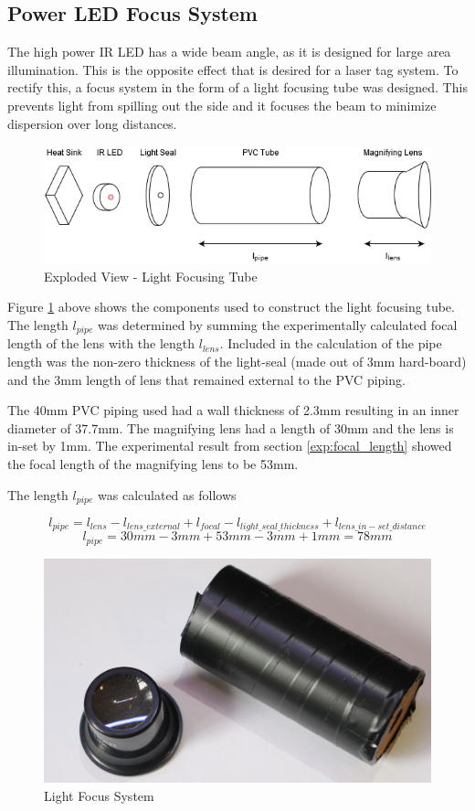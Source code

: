 \subsection{Power LED Focus System}

The high power IR LED has a wide beam angle, as it is designed for large area illumination. This is the opposite effect that is desired for a laser tag system. To rectify this, a focus system in the form of a light focusing tube was designed. This prevents light from spilling out the side and it focuses the beam to minimize dispersion over long distances.

\begin{figure}[H]
	\centering
	\includegraphics[width=.8\textwidth]{figures/design/beam_tube.png}
	\caption{Exploded View - Light Focusing Tube}
	\label{fig:light_focusing_tube}
\end{figure}

Figure \ref{fig:light_focusing_tube} above shows the components used to construct the light focusing tube. The length $l_{pipe}$ was determined by summing the experimentally calculated focal length of the lens with the length $l_{lens}$. Included in the calculation of the pipe length was the non-zero thickness of the light-seal (made out of 3mm hard-board) and the 3mm length of lens that remained external to the PVC piping.

The 40mm PVC piping used had a wall thickness of 2.3mm resulting in an inner diameter of 37.7mm. The magnifying lens had a length of 30mm and the lens is in-set by 1mm. The experimental result from section \ref{exp:focal_length} showed the focal length of the magnifying lens to be 53mm.

The length $l_{pipe}$ was calculated as follows

\[l_{pipe} = l_{lens} - l_{lens\_external} + l_{focal} - l_{light\_seal\_thickness} + l_{lens\_in-set\_distance}\]
\[l_{pipe} = 30mm - 3mm + 53mm - 3mm + 1mm = 78mm\]


\begin{figure}[H]
	\centering
	\includegraphics[width=.6\textwidth]{figures/modules/light_focus_tube_lens.jpg}
	\caption{Light Focus System}
	\label{fig:module_light_focus}
\end{figure}

